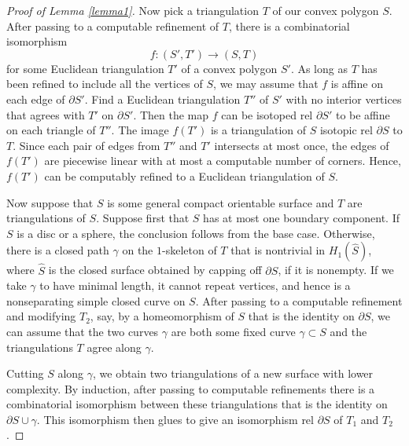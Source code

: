\documentclass[11pt]{amsart}
\theoremstyle{remark}
\numberwithin{equation}{section}
\begin{document}
\begin {proof}[Proof of Lemma \ref{lemma1}]
Now pick a triangulation $T$ of our convex polygon $S$. After  passing to a computable refinement of $T $, there is a combinatorial isomorphism $$f  : ( S' ,T ') \longrightarrow (S,T )$$ for some Euclidean triangulation $T '$ of a convex polygon $ S' $. As long as $T $ has been refined to include all the vertices of $S$, we may assume that $f$ is affine on each edge of $\partial S'$. Find a Euclidean triangulation $T'' $ of $ S' $ with no interior vertices that agrees with $T '$ on $\partial S'$. Then  the map $f $ can be isotoped rel $\partial S'$ to be affine on each triangle of $T'' $. The image $f (T ')$ is a triangulation of $S$ isotopic rel $\partial S$ to $T $. Since each pair of edges from $T'' $ and $T '$  intersects at most once, the edges of $f (T ')$ are piecewise linear with at most a computable number of corners. Hence, $f (T ')$ can be computably refined to a Euclidean  triangulation of $S$.

 Now suppose that $S $ is some general  compact orientable surface  and $T $  are triangulations of $S $.  Suppose first that $S $ has at most one boundary component.  If $S$  is a disc or a sphere, the conclusion follows from the base case.  Otherwise, there is a closed path $\gamma $ on  the $1$-skeleton of $T $ that is nontrivial in $H_1(\hat S)$,  where $\hat S$ is the closed surface obtained by capping off $\partial S$, if it is nonempty.  If we take $\gamma  $ to have minimal length, it cannot repeat vertices, and hence is a nonseparating   simple closed curve on $S$. After passing to a computable refinement and modifying $T_2$, say, by a homeomorphism of $S$ that is the identity on $\partial S$, we can assume that the two curves $\gamma $ are both some fixed curve $\gamma \subset S$ and the triangulations $T $ agree along $\gamma $. 

Cutting $S$ along $\gamma$, we obtain two triangulations of a new surface with lower complexity. By induction, after passing to  computable refinements there is a  combinatorial isomorphism between these triangulations that is the identity on $\partial S \cup \gamma$.  This isomorphism then glues to give an isomorphism rel $\partial S$ of $T_1$ and $T_2$.


\end{proof}
\end{document}
